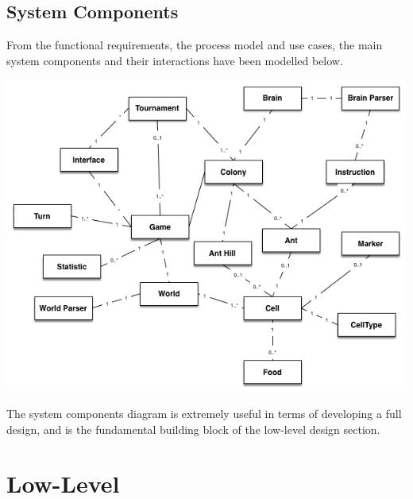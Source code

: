 \documentclass[11pt]{article}
\begin{document}
\subsection{System Components}\label{system-components}

From the functional requirements, the process model and use cases, the
main system components and their interactions have been modelled below.

\begin{center}
\includegraphics[width=\textwidth]{diagrams/system-components.png}
\end{center}

The system components diagram is extremely useful in terms of developing
a full design, and is the fundamental building block of the low-level
design section.

\newpage
\section{Low-Level}
\end{document}
